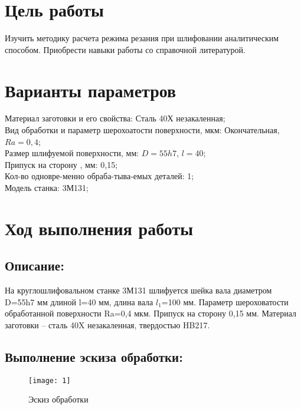 








\section{Цель работы}
Изучить методику расчета режима резания при шлифовании аналитическим способом. Приобрести навыки работы со справочной литературой.

\section{Варианты параметров}	
	
Материал заготовки и его свойства: Сталь 40Х незакаленная;\\

Вид обработки и параметр шерохоатости поверхности, мкм: Окончательная, $Ra=0,4$;\\

Размер шлифуемой поверхности, мм: $D=55h7$, $l=40$;\\

Припуск на сторону , мм: 0,15;\\

Кол-во одновре-менно обраба-тыва-емых деталей: 1;\\

Модель станка: 3М131;\\
				
\section{Ход выполнения работы}

\subsection{Описание:}
На круглошлифовальном станке 3М131 шлифуется шейка вала диаметром D=55h7 мм длиной l=40 мм, длина вала $l_1$=100 мм. Параметр шероховатости обработанной поверхности Ra=0,4 мкм. Припуск на сторону 0,15 мм. Материал заготовки – сталь 40X незакаленная, твердостью HB217.

\subsection{Выполнение эскиза обработки:}
\begin{figure}[H]
	\begin{center}
		\texttt{[image: 1]}
		\caption{Эскиз обработки} 
		\label{pic:pic_1} %
	\end{center}
\end{figure}

